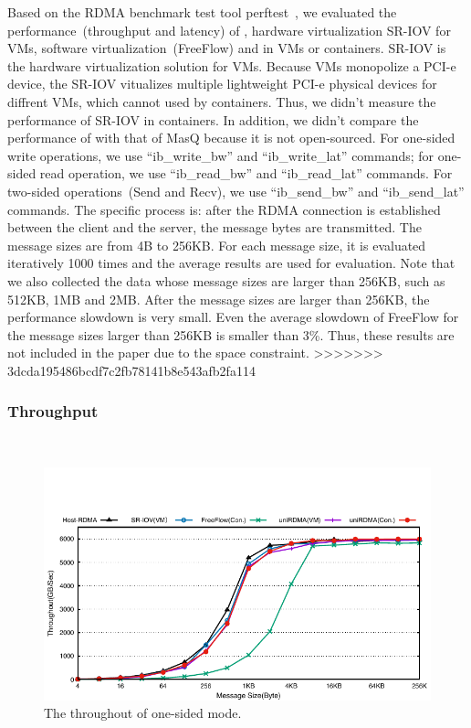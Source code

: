 Based on the RDMA benchmark test tool perftest~\cite{perftest}, we evaluated the performance~(throughput and latency) of \native, hardware virtualization SR-IOV for VMs,  software virtualization~(FreeFlow) and \sys in VMs or containers. SR-IOV is the hardware virtualization solution for VMs. Because VMs monopolize a PCI-e device, the SR-IOV vitualizes multiple lightweight PCI-e physical devices for diffrent VMs, which cannot used by containers. Thus, we didn't measure the performance of SR-IOV in containers. In addition, we didn't compare the performance of \sys with that of MasQ because it is not open-sourced. For one-sided write operations, we use ``ib\_write\_bw'' and ``ib\_write\_lat'' commands; for one-sided read operation, we use ``ib\_read\_bw'' and ``ib\_read\_lat'' commands. For two-sided operations~(Send and Recv), we use ``ib\_send\_bw'' and ``ib\_send\_lat'' commands. The specific process is: after the RDMA connection is established between the client and the server, the message bytes are transmitted. The message sizes are from 4B to 256KB. For each message size,  it is evaluated iteratively 1000 times and the average results are used for evaluation.  Note that we also collected the data whose message sizes are larger than 256KB, such as 512KB, 1MB and 2MB. After the message sizes are larger than 256KB, the performance slowdown is very small. Even the average slowdown of FreeFlow for the message sizes larger than 256KB is smaller than 3\%. Thus, these results are not included in the paper due to the space constraint. 
>>>>>>> 3dcda195486bcdf7c2fb78141b8e543afb2fa114

\subsubsection{\textbf{Throughput}}
\
\noindent

\begin{figure}[!ht]
	\centering
	\includegraphics[width=1.00\linewidth]{images/write-bw.pdf}
	\caption{The throughout of one-sided mode.}
	\label{fig:write-bw}
\end{figure}


